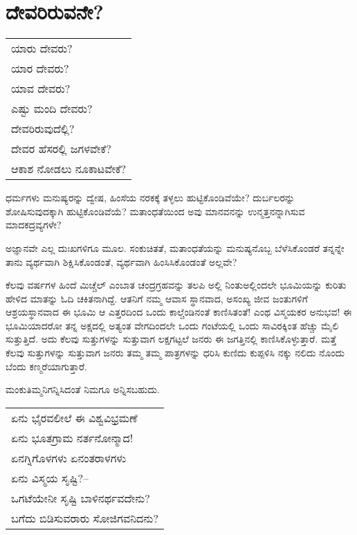 
\chapter{ದೇವರಿರುವನೇ?}

\indentsecionsintoc

{\centering

\begin{tabular}{@{}l@{}}
ಯಾರು ದೇವರು? \\
ಯಾರ ದೇವರು? \\
ಯಾವ ದೇವರು? \\
ಎಷ್ಟು ಮಂದಿ ದೇವರು? \\
ದೇವರಿರುವುದೆಲ್ಲಿ? \\
ದೇವರ ಹೆಸರಲ್ಲಿ ಜಗಳವೇಕೆ? \\
ಆಕಾಶ ನೋಡಲು ನೂಕಾಟವೇಕೆ? \\
\end{tabular}

}\smallskip

ಧರ್ಮಗಳು ಮನುಷ್ಯರನ್ನು ದ್ವೇಷ, ಹಿಂಸೆಯ ನರಕಕ್ಕೆ ತಳ್ಳಲು ಹುಟ್ಟಿಕೊಂಡಿವೆಯೇ? ದುರ್ಬಲರನ್ನು ಶೋಷಿಸುವುದಕ್ಕಾಗಿ ಹುಟ್ಟಿಕೊಂಡಿವೆಯೆ? ಮತಾಂಧತೆಯಿಂದ ಅವು ಮಾನವನನ್ನು ಉನ್ಮತ್ತನನ್ನಾಗಿಸುವ ಮಾದಕದ್ರವ್ಯಗಳೇ?

ಅಜ್ಞಾನವೇ ಎಲ್ಲ ದುಃಖಗಳಿಗೂ ಮೂಲ. ಸಂಕುಚಿತತೆ, ಮತಾಂಧತೆಯನ್ನು ಮನುಷ್ಯನೊಬ್ಬ ಬೆಳೆಸಿಕೊಂಡರೆ ತನ್ನನ್ನೇ ತಾನು ವ್ಯರ್ಥವಾಗಿ ಶಿಕ್ಷಿಸಿಕೊಂಡಂತೆ, ವ್ಯರ್ಥವಾಗಿ ಹಿಂಸಿಸಿಕೊಂಡಂತೆ ಅಲ್ಲವೇ?

ಕೆಲವು ವರ್ಷಗಳ ಹಿಂದೆ ಮಿಚ್ಚೆಲ್ ಎಂಬಾತ ಚಂದ್ರಗ್ರಹವನ್ನು ತಲಪಿ ಅಲ್ಲಿ ನಿಂತು\break ಅಲ್ಲಿಂದಲೇ ಭೂಮಿಯನ್ನು ಕುರಿತು ಹೇಳಿದ ಮಾತನ್ನು ಓದಿ ಚಕಿತನಾಗಿದ್ದೆ. ಆತನಿಗೆ ನಮ್ಮ ಆವಾಸ ಸ್ಥಾನವಾದ, ಅಸಂಖ್ಯ ಜೀವ ಜಂತುಗಳಿಗೆ ಆಶ್ರಯಸ್ಥಾನವಾದ ಈ ಭೂಮಿ ಆ ಎತ್ತರದಿಂದ ಒಂದು ಕಾಲ್ಚೆಂಡಿನಂತೆ ಕಾಣಿಸಿತಂತೆ! ಎಂಥ ವಿಸ್ಮಯಕರ ಅನುಭವ! ಈ ಭೂಮಿಯಾದರೋ ತನ್ನ ಅಕ್ಷದಲ್ಲಿ ಅತ್ಯಂತ ವೇಗದಿಂದಲೇ ಒಂದು ಗಂಟೆಯಲ್ಲಿ ಒಂದು ಸಾವಿರಕ್ಕಿಂತ ಹೆಚ್ಚು ಮೈಲಿ ಸುತ್ತುತ್ತಿದೆ. ಅದು ಕೆಲವು ಸುತ್ತುಗಳನ್ನು ಸುತ್ತುವಾಗ ಲಕ್ಷಗಟ್ಟಲೆ ಜನರು ಈ ಜಗತ್ತಿನಲ್ಲಿ ಕಾಣಿಸಿ\-ಕೊಳ್ಳುತ್ತಾರೆ. ಮತ್ತೆ ಕೆಲವು ಸುತ್ತುಗಳನ್ನು ಸುತ್ತುವಾಗ ಜನರು ತಮ್ಮ ತಮ್ಮ ಪಾತ್ರಗಳನ್ನು ಧರಿಸಿ ಕುಣಿದು ಕುಪ್ಪಳಿಸಿ ನಕ್ಕು ನಲಿದು ನೊಂದು ಬೆಂದು ಕಣ್ಮರೆಯಾಗುತ್ತಾರೆ.

ಮಂಕುತಿಮ್ಮನಿಗನ್ನಿಸಿದಂತೆ ನಿಮಗೂ ಅನ್ನಿಸಬಹುದು.

{\centering

\begin{longtable}[c]{@{}l@{}}
ಏನು ಭೈರವಲೀಲೆ ಈ ವಿಶ್ವವಿಭ್ರಮಣೆ \\
ಏನು ಭೂತಗ್ರಾಮ ನರ್ತನೋನ್ಮಾದ! \\
ಏನಗ್ನಿಗೊಳಗಳು ಏನಂತರಾಳಗಳು \\
ಏನು ವಿಸ್ಮಯ ಸೃಷ್ಟಿ?– \\
ಒಗಟೆಯೇನೀ ಸೃಷ್ಟಿ ಬಾಳಿನರ್ಥವದೇನು? \\
ಬಗೆದು ಬಿಡಿಸುವರಾರು ಸೋಜಿಗವನಿದನು? \\
\end{longtable}

}\smallskip

